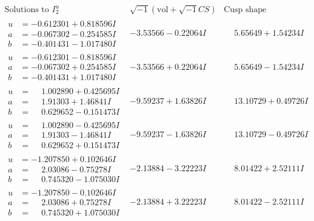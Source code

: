 \documentclass[1p]{elsarticle_modified}
\theoremstyle{definition}
\newcommand{\I}{\sqrt{-1}}
\begin{document}
$$\begin{array}{c|c|c}  
\text{Solutions to }I^u_{2}& \I (\text{vol} + \sqrt{-1}CS) & \text{Cusp shape}\\
 \hline 
\begin{aligned}
u &= -0.612301 + 0.818596 I \\
a &= -0.067302 - 0.254585 I \\
b &= -0.401431 - 1.017480 I\end{aligned}
 & -3.53566 - 0.22064 I & \phantom{-}5.65649 + 1.54234 I \\ \hline\begin{aligned}
u &= -0.612301 - 0.818596 I \\
a &= -0.067302 + 0.254585 I \\
b &= -0.401431 + 1.017480 I\end{aligned}
 & -3.53566 + 0.22064 I & \phantom{-}5.65649 - 1.54234 I \\ \hline\begin{aligned}
u &= \phantom{-}1.002890 + 0.425695 I \\
a &= \phantom{-}1.91303 + 1.46841 I \\
b &= \phantom{-}0.629652 - 0.151473 I\end{aligned}
 & -9.59237 + 1.63826 I & \phantom{-}13.10729 + 0.49726 I \\ \hline\begin{aligned}
u &= \phantom{-}1.002890 - 0.425695 I \\
a &= \phantom{-}1.91303 - 1.46841 I \\
b &= \phantom{-}0.629652 + 0.151473 I\end{aligned}
 & -9.59237 - 1.63826 I & \phantom{-}13.10729 - 0.49726 I \\ \hline\begin{aligned}
u &= -1.207850 + 0.102646 I \\
a &= \phantom{-}2.03086 - 0.75278 I \\
b &= \phantom{-}0.745320 - 1.075030 I\end{aligned}
 & -2.13884 - 3.22223 I & \phantom{-}8.01422 + 2.52111 I \\ \hline\begin{aligned}
u &= -1.207850 - 0.102646 I \\
a &= \phantom{-}2.03086 + 0.75278 I \\
b &= \phantom{-}0.745320 + 1.075030 I\end{aligned}
 & -2.13884 + 3.22223 I & \phantom{-}8.01422 - 2.52111 I \\ \hline\begin{aligned}

\end{aligned}
\end{array}$$
\end{document}
